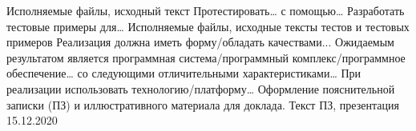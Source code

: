 {      {Исполняемые файлы, исходный текст}
      {}{}
    \projecttask{\projectsubtasknum}
      {Протестировать… с помощью…}
      {}
      {}{}
    \projecttask{\projectsubtasknum}
      {Разработать тестовые примеры для… }
      {Исполняемые файлы, исходные тексты тестов и тестовых примеров}
      {}{}
    \projecttask{\projectsubtasknum}
      {Реализация должна иметь форму/обладать качествами...}
      {}
      {}{}
    \projecttask{\projectsubtasknum}
      {Ожидаемым результатом является программная система/программный комплекс/программное обеспечение… со следующими отличительными характеристиками…}
      {}
      {}{}
    \projecttask{\projectsubtasknum}
      {При реализации использовать технологию/платформу…}
      {}
      {}{}
  \projecttask{\projecttasknum}
    {Оформление пояснительной записки (ПЗ) и иллюстративного материала для доклада.}
    {Текст ПЗ, презентация}
    {15.12.2020}{}
}

\taskliterature{
\nocite{Sychev}
\nocite{Sokolov}
\nocite{Gaidaenko}
}





\consultantrspzapproval{}


\authorpzapproval{}
\consultantpzapproval{}

